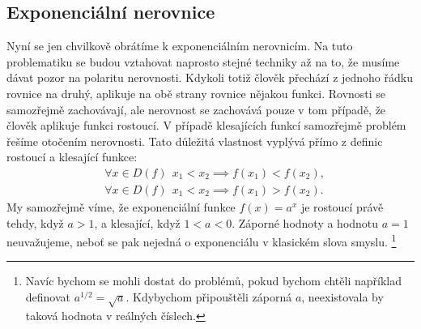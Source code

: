 \documentclass[11pt,a4paper]{article}
\begin{document}
\begin{enumerate}[label=(\alph*)]
        \end{enumerate}

        \subsection*{Exponenciální nerovnice}
        Nyní se jen chvilkově obrátíme k exponenciálním nerovnicím. Na tuto problematiku se budou vztahovat naprosto stejné techniky až na to, že musíme dávat pozor na polaritu nerovnosti. Kdykoli totiž člověk přechází z jednoho řádku rovnice na druhý, aplikuje na obě strany rovnice nějakou funkci. Rovnosti se samozřejmě zachovávají, ale nerovnost se zachovává pouze v tom případě, že člověk aplikuje funkci rostoucí. V případě klesajících funkcí samozřejmě problém řešíme otočením nerovnosti. Tato důležitá vlastnost vyplývá přímo z definic rostoucí a klesající funkce:
        \begin{align*}
            \tag{rostoucí}
            &\forall x \in D(f)\, \; x_1 < x_2 \implies f(x_1) < f(x_2),
        \\
            \tag{klesající}
            &\forall x \in D(f)\, \; x_1 < x_2 \implies f(x_1) > f(x_2).
        \end{align*}
        My samozřejmě víme, že exponenciální funkce $f(x) = a^x$ je rostoucí právě tehdy, když $a>1$, a klesající, když $1<a<0$. Záporné hodnoty a hodnotu $a=1$ neuvažujeme, neboť se pak nejedná o exponenciálu v klasickém slova smyslu.%
            \footnote{Navíc bychom se mohli dostat do problémů, pokud bychom chtěli například definovat $a^{1/2} = \sqrt a$. Kdybychom připouštěli záporná $a$, neexistovala by taková hodnota v reálných číslech.}
\end{document}

